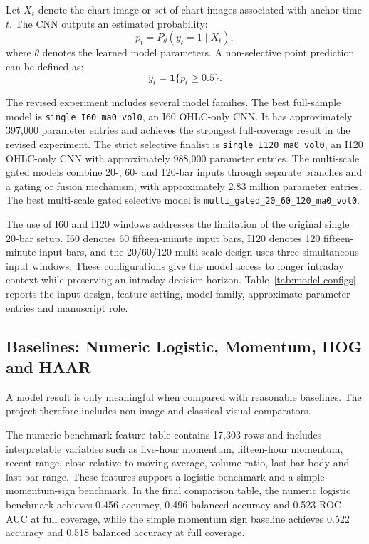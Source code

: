 



Let \(X_t\) denote the chart image or set of chart images associated with anchor time \(t\). The CNN outputs an estimated probability:
\begin{equation}
p_t = P_\theta(y_t = 1 \mid X_t),
\label{eq:prob}
\end{equation}
where \(\theta\) denotes the learned model parameters. A non-selective point prediction can be defined as:
\begin{equation}
\hat{y}_t = \mathbf{1}\{p_t \ge 0.5\}.
\label{eq:prediction}
\end{equation}

The revised experiment includes several model families. The best full-sample model is \texttt{single\_I60\_ma0\_vol0}, an I60 OHLC-only CNN. It has approximately 397,000 parameter entries and achieves the strongest full-coverage result in the revised experiment. The strict selective finalist is \texttt{single\_I120\_ma0\_vol0}, an I120 OHLC-only CNN with approximately 988,000 parameter entries. The multi-scale gated models combine 20-, 60- and 120-bar inputs through separate branches and a gating or fusion mechanism, with approximately 2.83 million parameter entries. The best multi-scale gated selective model is \texttt{multi\_gated\_20\_60\_120\_ma0\_vol0}.

The use of I60 and I120 windows addresses the limitation of the original single 20-bar setup. I60 denotes 60 fifteen-minute input bars, I120 denotes 120 fifteen-minute input bars, and the 20/60/120 multi-scale design uses three simultaneous input windows. These configurations give the model access to longer intraday context while preserving an intraday decision horizon. Table~\ref{tab:model-configs} reports the input design, feature setting, model family, approximate parameter entries and manuscript role.

\subsection{Baselines: Numeric Logistic, Momentum, HOG and HAAR}
\label{subsec:baselines}

A model result is only meaningful when compared with reasonable baselines. The project therefore includes non-image and classical visual comparators.

The numeric benchmark feature table contains 17,303 rows and includes interpretable variables such as five-hour momentum, fifteen-hour momentum, recent range, close relative to moving average, volume ratio, last-bar body and last-bar range. These features support a logistic benchmark and a simple momentum-sign benchmark. In the final comparison table, the numeric logistic benchmark achieves 0.456 accuracy, 0.496 balanced accuracy and 0.523 ROC-AUC at full coverage, while the simple momentum sign baseline achieves 0.522 accuracy and 0.518 balanced accuracy at full coverage.

